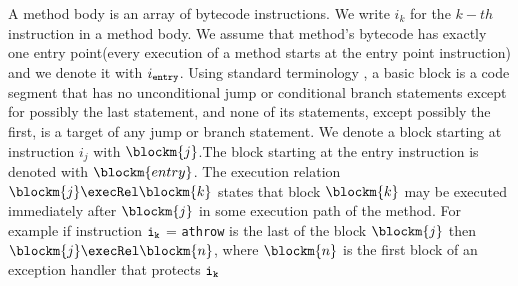  A method body is an array of bytecode instructions. We write $i_k$ for the $k-th$ instruction in a method body.
 We assume that method's bytecode has exactly one entry point(every execution of a method starts at the entry point instruction) and we denote it with $i_{\tt{entry}}$. Using standard terminology \cite{ARUCom1986}, a
basic block is a code segment that has no unconditional jump or
conditional branch statements except for possibly the last
statement, and none of its statements, except possibly the first,
is a target of any jump or branch statement. 
 We denote a block starting at instruction  $i_{j}$ with $\blockm{j}$.The block starting at the entry instruction is denoted with $\blockm{entry}$.
 The execution relation  $\blockm{j} \execRel \blockm{k}$  states that block $\blockm{k}$ may be executed immediately after $\blockm{j}$ in some execution path of the method. For example if  instruction $\tt{i_{k}}$ = \texttt{athrow} is the last of the block $\blockm{j}$ then 
$\blockm{j} \execRel \blockm{n}$, where  $\blockm{n}$ is the first block of an exception handler that protects $\tt{i_{k}}$ 

